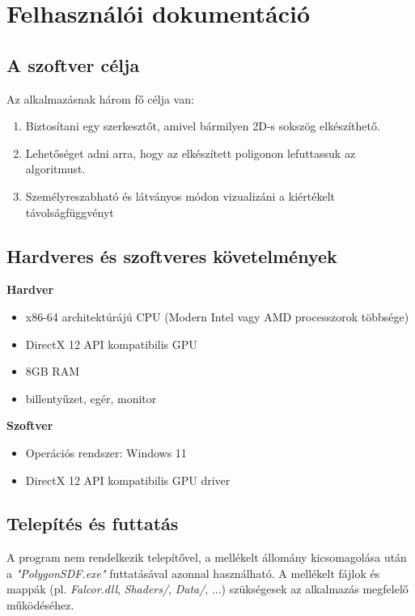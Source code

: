 \chapter{Felhasználói dokumentáció}
\label{ch:user}


\section{A szoftver célja}

Az alkalmazásnak három fő célja van:
\begin{enumerate}
    \item Biztosítani egy szerkesztőt, amivel bármilyen 2D-s sokszög elkészíthető.
    \item Lehetőséget adni arra, hogy az elkészített poligonon lefuttassuk az algoritmust.
    \item Személyreszabható és látványos módon vizualizáni a kiértékelt távolságfüggvényt
\end{enumerate}


\section{Hardveres és szoftveres követelmények}

\textbf{Hardver}
\begin{itemize}
    \item x86-64 architektúrájú CPU (Modern Intel vagy AMD processzorok többsége)
    \item DirectX 12 API kompatibilis GPU
    \item 8GB RAM
    \item billentyűzet, egér, monitor
\end{itemize}

\textbf{Szoftver}
\begin{itemize}
    \item Operációs rendszer: Windows 11
    \item DirectX 12 API kompatibilis GPU driver
\end{itemize}


\section{Telepítés és futtatás}

A program nem rendelkezik telepítővel, a mellékelt állomány kicsomagolása után a \textit{"PolygonSDF.exe"} futtatásával azonnal használható. A mellékelt fájlok és mappák (pl. \textit{Falcor.dll}, \textit{Shaders/}, \textit{Data/}, ...) szükségesek az alkalmazás megfelelő működéséhez.


